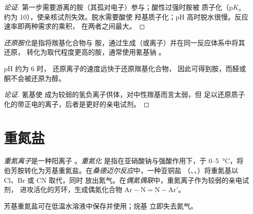 \begin{proof}[论证]
第一步需要游离的胺（其孤对电子）参与；酸性过强时胺被
质子化（$\mathrm pK_a$ 约为 10），使亲核试剂失效。脱水需要酸使
羟基质子化；pH 高时脱水很慢。反应速率即两种需求的乘积，
在两者之间最大。
\end{proof}

\begin{definition}[还原胺化]\label{def:b2:amines:reductive-amination}
\emph{还原胺化}是指将羰基化合物与
胺，通过生成（或离子）并在同一反应体系中将其还原，
转化为取代程度更高的胺，通常使用氰基钠 。
\end{definition}

\begin{proposition}[还原胺化的选择性]\label{prop:b2:amines:reductive-amination}
pH 约为 6 时， 还原离子的速度远快于还原羰基化合物，
因此可得到胺，而醛或酮不会被还原为醇。
\end{proposition}

\begin{proof}[论证]
氰基使  成为较弱的氢负离子供体，对中性羰基而言太弱，但
足以还原质子化的带正电的离子，后者是更好的亲电试剂。
\end{proof}

\section{重氮盐}

\begin{definition}[重氮化学]\label{def:b2:amines:diazonium}
\emph{重氮离子}是一种阳离子 。\emph{重氮化}
是指在亚硝酸钠与强酸作用下，于
0--\qty{5}{\degreeCelsius}，将伯芳胺转化为芳基重氮盐。在\emph{桑德迈尔反应}中，一种亚铜盐
（、、）将重氮基以 Cl、Br 或 CN 取代，同时
放出氮气。在\emph{偶氮偶联}中，重氮离子作为较弱的亲电试剂，
进攻活化的芳环，生成偶氮化合物 $\mathrm{Ar{-}N{=}N{-}Ar'}$。
\end{definition}

\begin{proposition}[重氮离子的稳定性]\label{prop:b2:amines:diazonium}
芳基重氮盐可在低温水溶液中保存并使用；烷基
立即失去氮气。
\end{proposition}

